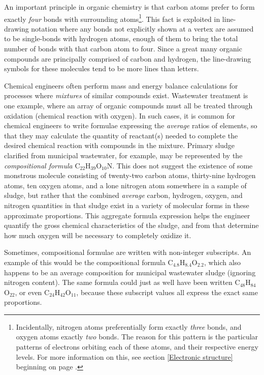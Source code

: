 An important principle in organic chemistry is that carbon atoms prefer to form exactly \textit{four} bonds with surrounding atoms\footnote{Incidentally, nitrogen atoms preferentially form exactly \textit{three} bonds, and oxygen atoms exactly \textit{two} bonds.  The reason for this pattern is the particular patterns of electrons orbiting each of these atoms, and their respective energy levels.  For more information on this, see section \ref{Electronic structure} beginning on page \pageref{Electronic structure}.}.  This fact is exploited in line-drawing notation where any bonds not explicitly shown at a vertex are assumed to be single-bonds with hydrogen atoms, enough of them to bring the total number of bonds with that carbon atom to four.  Since a great many organic compounds are principally comprised of carbon and hydrogen, the line-drawing symbols for these molecules tend to be more lines than letters.

\vskip 10pt

\filbreak

Chemical engineers often perform mass and energy balance calculations for processes where \textit{mixtures} of similar compounds exist.  Wastewater treatment is one example, where an array of organic compounds must all be treated through oxidation (chemical reaction with oxygen).  In such cases, it is common for chemical engineers to write formulae expressing the \textit{average} ratios of elements, so that they may calculate the quantity of reactant(s) needed to complete the desired chemical reaction with compounds in the mixture.  Primary sludge clarified from municipal wastewater, for example, may be represented by the \textit{compositional formula} C$_{22}$H$_{39}$O$_{10}$N.  This does not suggest the existence of some monstrous molecule consisting of twenty-two carbon atoms, thirty-nine hydrogen atoms, ten oxygen atoms, and a lone nitrogen atom somewhere in a sample of sludge, but rather that the combined \textit{average} carbon, hydrogen, oxygen, and nitrogen quantities in that sludge exist in a variety of molecular forms in these approximate proportions.  This aggregate formula expression helps the engineer quantify the gross chemical characteristics of the sludge, and from that determine how much oxygen will be necessary to completely oxidize it.  

Sometimes, compositional formulae are written with non-integer subscripts.  An example of this would be the compositional formula C$_{4.8}$H$_{8.4}$O$_{2.2}$, which also happens to be an average composition for municipal wastewater sludge (ignoring nitrogen content).  The same formula could just as well have been written C$_{48}$H$_{84}$O$_{22}$, or even C$_{24}$H$_{42}$O$_{11}$, because these subscript values all express the exact same proportions.








